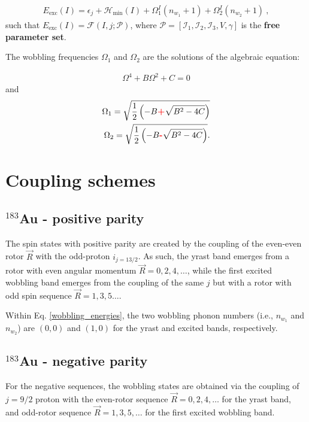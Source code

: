 \documentclass[12pt, a4paper]{article}
\begin{document}
\begin{align}
    E_\text{exc}(I)=\epsilon_j+\mathcal{H}_\text{min}(I)+\Omega_1^I\left(n_{w_1}+1\right)+\Omega_2^I\left(n_{w_2}+1\right)\ ,
    \label{wobbling_energies}
\end{align}
such that $E_\text{exc}(I)=\mathcal{F}(I,j;\mathcal{P})$, where $\mathcal{P}=\left[\mathcal{I}_1,\mathcal{I}_2,\mathcal{I}_3,V,\gamma\right]$ is the \textbf{free parameter set}.

The wobbling frequencies $\Omega_1$ and $\Omega_2$ are the solutions of the algebraic equation:

\begin{align}
    \Omega^4+B\Omega^2+C=0
\end{align}
and 
\begin{align}
    \Omega_1=\sqrt{\frac{1}{2}\left(-B{\color{red}\textbf{+}}\sqrt{B^2-4C}\right)}\\
    \Omega_2=\sqrt{\frac{1}{2}\left(-B{\color{red}\textbf{-}}\sqrt{B^2-4C}\right)}.
\end{align}

\section{Coupling schemes}

\subsection{$^{183}$Au - positive parity}

The spin states with positive parity are created by the coupling of the even-even rotor $\vec{R}$ with the odd-proton $i_{j=13/2}$. As such, the yrast band emerges from a rotor with even angular momentum $\vec{R}=0,2,4,\dots$, while the first excited wobbling band emerges from the coupling of the same $j$ but with a rotor with odd spin sequence $\vec{R}=1,3,5\dots$.

Within Eq. \ref{wobbling_energies}, the two wobbling phonon numbers (i.e., $n_{w_1}$ and $n_{w_2}$) are $(0,0)$ and $(1,0)$ for the yrast and excited bands, respectively.

\subsection{$^{183}$Au - negative parity}

For the negative sequences, the wobbling states are obtained via the coupling of $j=9/2$ proton with the even-rotor sequence $\vec{R}=0,2,4,\dots$ for the yrast band, and odd-rotor sequence $\vec{R}=1,3,5,\dots$ for the first excited wobbling band.
\end{document}
